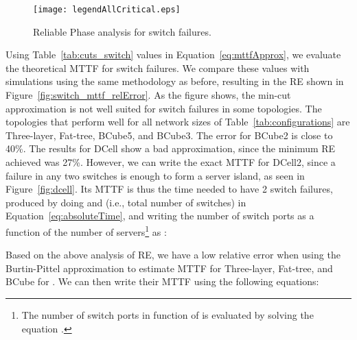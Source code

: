 \begin{figure}
\centering
{}
{\texttt{[image: legendAllCritical.eps]}}
\caption{Reliable Phase analysis for switch failures.}
\end{figure}

Using Table~\ref{tab:cuts_switch} values in Equation~\ref{eq:mttfApprox}, we evaluate the theoretical MTTF for switch failures.
We compare these values with simulations using the same methodology as before, resulting in the RE shown in Figure~\ref{fig:switch_mttf_relError}. 
As the figure shows, the min-cut approximation is not well suited for switch failures in some topologies. The topologies that perform well for all network sizes of Table~\ref{tab:configurations} are Three-layer, Fat-tree, BCube5, and BCube3. 
The error for BCube2 is close to 40\%. The results for DCell show a bad approximation, since the minimum RE achieved was 27\%. 
However, we can write the exact MTTF for DCell2, since a failure in any two switches is enough to form a server island, as seen in Figure~\ref{fig:dcell}. 
Its MTTF is thus the time needed to have 2 switch failures, produced by doing  and  (i.e., total number of switches) in Equation~\ref{eq:absoluteTime}, 
and writing the number of switch ports as a function of the number of servers\footnote{The number of switch ports  in function of  is evaluated by solving the equation .} as : 

Based on the above analysis of RE, we have a low relative error when using the Burtin-Pittel approximation to estimate MTTF for Three-layer, Fat-tree, and BCube for . We can then write their MTTF using the following equations:




